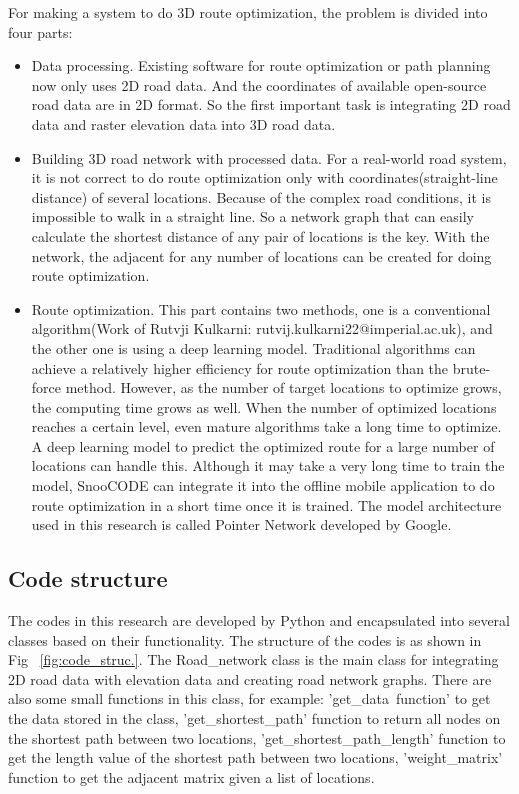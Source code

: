 \documentclass[final-report]{report-template}
\begin{document}
For making a system to do 3D route optimization, the problem is divided into four parts: 
\begin{itemize}
    \item Data processing. Existing software for route optimization or path planning now only uses 2D road data.
          And the coordinates of available open-source road data are in 2D format.
          So the first important task is integrating 2D road data and raster elevation data into 3D road data.
    \item Building 3D road network with processed data. 
          For a real-world road system, it is not correct to do route optimization only with coordinates(straight-line distance) of several locations.
          Because of the complex road conditions, it is impossible to walk in a straight line.
          So a network graph that can easily calculate the shortest distance of any pair of locations is the key.
          With the network, the adjacent for any number of locations can be created for doing route optimization.
    \item Route optimization. This part contains two methods, 
          one is a conventional algorithm(Work of Rutvji Kulkarni: rutvij.kulkarni22@imperial.ac.uk), 
          and the other one is using a deep learning model. 
          Traditional algorithms can achieve a relatively higher efficiency for route optimization than the brute-force method.
          However, as the number of target locations to optimize grows, the computing time grows as well.
          When the number of optimized locations reaches a certain level, even mature algorithms take a long time to optimize.
          A deep learning model to predict the optimized route for a large number of locations can handle this.
          Although it may take a very long time to train the model, 
          SnooCODE can integrate it into the offline mobile application to do route optimization in a short time once it is trained.
          The model architecture used in this research is called Pointer Network developed by Google.
\end{itemize}

\subsection{Code structure}
The codes in this research are developed by Python and encapsulated into several classes based on their functionality.
The structure of the codes is as shown in Fig~ \ref{fig:code_struc.}.
The Road\_network class is the main class for integrating 2D road data with elevation data and creating road network graphs.
There are also some small functions in this class, 
for example: 'get\_data\ function' to get the data stored in the class, 
'get\_shortest\_path' function to return all nodes on the shortest path between two locations,
'get\_shortest\_path\_length' function to get the length value of the shortest path between two locations,
'weight\_matrix' function to get the adjacent matrix given a list of locations. 
\end{document}

